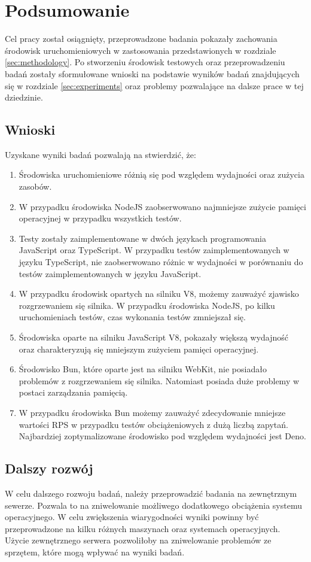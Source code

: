 \section{Podsumowanie}
Cel pracy został osiągnięty, przeprowadzone badania pokazały zachowania środowisk uruchomieniowych w zastosowania przedstawionych w rozdziale \ref{sec:methodology}. Po stworzeniu środowisk testowych oraz przeprowadzeniu badań zostały sformułowane wnioski na podstawie wyników badań znajdujących się w rozdziale \ref{sec:experiments} oraz problemy pozwalające na dalsze prace w tej dziedzinie.

\subsection{Wnioski}
Uzyskane wyniki badań pozwalają na stwierdzić, że:
\begin{enumerate}
  \item Środowiska uruchomieniowe różnią się pod względem wydajności oraz zużycia zasobów. 
  \item W przypadku środowiska NodeJS zaobserwowano najmniejsze zużycie pamięci operacyjnej w przypadku wszystkich testów.
  \item Testy zostały zaimplementowane w dwóch językach programowania JavaScript oraz TypeScript. W przypadku testów zaimplementowanych w języku TypeScript, nie zaobserwowano różnic w wydajności w porównaniu do testów zaimplementowanych w języku JavaScript.
  \item W przypadku środowisk opartych na silniku V8, możemy zauważyć zjawisko rozgrzewaniem się silnika. W przypadku środowiska NodeJS, po kilku uruchomieniach testów, czas wykonania testów zmniejszał się.
  \item Środowiska oparte na silniku JavaScript V8, pokazały większą wydajność oraz charakteryzują się mniejszym zużyciem pamięci operacyjnej.
  \item Środowisko Bun, które oparte jest na silniku WebKit, nie posiadało problemów z rozgrzewaniem się silnika. Natomiast posiada duże problemy w postaci zarządzania pamięcią.
  \item W przypadku środowiska Bun możemy zauważyć zdecydowanie mniejsze wartości RPS w przypadku testów obciążeniowych z dużą liczbą zapytań. Najbardziej zoptymalizowane środowisko pod względem wydajności jest Deno.
\end{enumerate}

\subsection{Dalszy rozwój}
W celu dalszego rozwoju badań, należy przeprowadzić badania na zewnętrznym sewerze. Pozwala to na zniwelowanie możliwego dodatkowego obciążenia systemu operacyjnego. W celu zwiększenia wiarygodności wyniki powinny być przeprowadzone na kilku różnych maszynach oraz systemach operacyjnych. Użycie zewnętrznego serwera pozwoliłoby na zniwelowanie problemów ze sprzętem, które mogą wpływać na wyniki badań.

